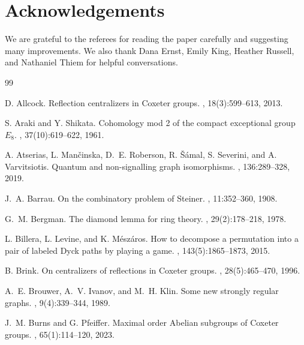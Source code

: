 \documentclass[11pt]{amsart}
\theoremstyle{plain}
\theoremstyle{definition}
\theoremstyle{remark}
\numberwithin{equation}{subsection}
\begin{document}
\section*{Acknowledgements}
We are grateful to the referees for reading the paper carefully and suggesting
many improvements. We also thank Dana Ernst, Emily King, Heather Russell, and
Nathaniel Thiem for helpful conversations.



\begin{thebibliography}{99}



    D. Allcock.
\newblock Reflection centralizers in {C}oxeter groups.
, 18(3):599--613, 2013.

    S. Araki and Y. Shikata.
\newblock Cohomology mod 2 of the compact exceptional group ${E}_8$.
, 37(10):619--622, 1961.

    A. Atserias, L. Man{\v{c}}inska, D.~E. Roberson, R.  {\v{S}}{\'a}mal, S.
    Severini, and A. Varvitsiotis.
\newblock Quantum and non-signalling graph isomorphisms.
, 136:289--328, 2019.

J.~A. Barrau.
\newblock On the combinatory problem of {S}teiner.
, 11:352--360, 1908.

    G.~M. Bergman.
\newblock The diamond lemma for ring theory.
, 29(2):178--218, 1978.

    L. Billera, L. Levine, and K. M{\'e}sz{\'a}ros.
\newblock How to decompose a permutation into a pair of labeled {D}yck paths by
  playing a game.
,
  143(5):1865--1873, 2015.

B. Brink.
\newblock On centralizers of reflections in {C}oxeter groups.
, 28(5):465--470, 1996.

A.~E. Brouwer, A.~V. Ivanov, and M.~H. Klin.
\newblock Some new strongly regular graphs.
, 9(4):339--344, 1989.

J.~M. Burns and G. Pfeiffer.
\newblock Maximal order {A}belian subgroups of {C}oxeter groups.
, 65(1):114--120, 2023.




\end{thebibliography}
\end{document}
